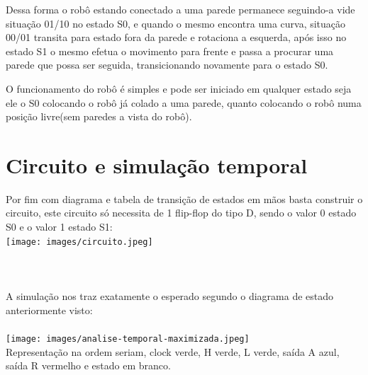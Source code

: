 \documentclass[
	12pt,				%
	openright,			%
	oneside,			%
	a4paper,			%
	chapter=TITLE,		%
	section=TITLE,		%
	english,			%
	brazil				%
	]{abntex2}
\begin{document}
Dessa forma o robô estando conectado a uma parede permanece seguindo-a vide situação 01/10 no estado S0, e quando o mesmo encontra uma curva, situação 00/01 transita para estado fora da parede e rotaciona a esquerda, após isso no estado S1 o mesmo efetua o movimento para frente e passa a procurar uma parede que possa ser seguida, transicionando novamente para o estado S0.

O funcionamento do robô é simples e pode ser iniciado em qualquer estado seja ele o S0 colocando o robô já colado a uma parede, quanto colocando o robô numa posição livre(sem paredes a vista do robô).


\section{Circuito e simulação temporal}
Por fim com diagrama e tabela de transição de estados em mãos basta construir o circuito, este circuito só necessita de 1 flip-flop do tipo D, sendo o valor 0 estado S0 e o valor 1 estado S1:
\\
\texttt{[image: images/circuito.jpeg]}
\\ \\
\\
\\
A simulação nos traz exatamente o esperado segundo o diagrama de estado anteriormente visto:
\\ \\
\texttt{[image: images/analise-temporal-maximizada.jpeg]}
\\
Representação na ordem seriam, clock verde, H verde, L verde, saída A azul, saída R vermelho e estado em branco.
\postextual

%
\end{document}

